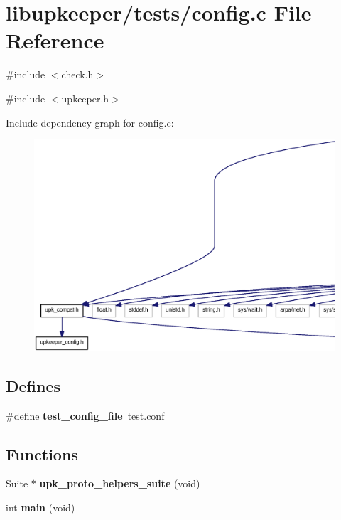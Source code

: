 \section{libupkeeper/tests/config.c File Reference}
\label{libupkeeper_2tests_2config_8c}
{\ttfamily \#include $<$check.h$>$}\par
{\ttfamily \#include $<$upkeeper.h$>$}\par
Include dependency graph for config.c:\nopagebreak
\begin{figure}[H]
\begin{center}
\leavevmode
\includegraphics[width=400pt]{libupkeeper_2tests_2config_8c__incl}
\end{center}
\end{figure}
\subsection*{Defines}
\begin{DoxyCompactItemize}
\item 
\#define {\bf test\_\-config\_\-file}~test.conf
\end{DoxyCompactItemize}
\subsection*{Functions}
\begin{DoxyCompactItemize}
\item 
Suite $\ast$ {\bf upk\_\-proto\_\-helpers\_\-suite} (void)
\item 
int {\bf main} (void)
\end{DoxyCompactItemize}


